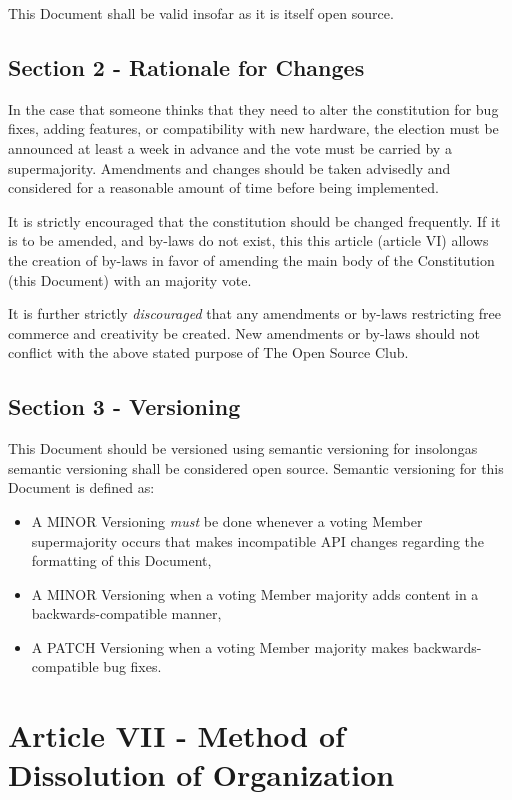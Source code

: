 \documentclass{article}
\begin{document}
  This Document shall be valid insofar as it is itself open source.

  \subsection{Section 2 - Rationale for Changes}

	In the case that someone thinks that they need to alter the constitution for bug fixes, adding features, or compatibility with new hardware, the election must be announced at least a week in advance and the vote must be carried by a supermajority. Amendments and changes should be taken advisedly and considered for a reasonable amount of time before being implemented.

	It is strictly encouraged that the constitution should be changed frequently. If it is to be amended, and by-laws do not exist, this this article (article VI) allows the creation of by-laws in favor of amending the main body of the Constitution (this Document) with an majority vote.

	It is further strictly \textit{discouraged} that any amendments or by-laws restricting free commerce and creativity be created. New amendments or by-laws should not conflict with the above stated purpose of The Open Source Club.

  \subsection{Section 3 - Versioning}

  This Document should be versioned using semantic versioning for insolongas semantic versioning shall be considered open source. Semantic versioning for this Document is defined as:

  \begin{itemize}
    \item A MINOR Versioning \textit{must} be done whenever a voting Member supermajority occurs that makes incompatible API changes regarding the formatting of this Document,
    \item A MINOR Versioning when a voting Member majority adds content in a backwards-compatible manner,
    \item A PATCH Versioning when a voting Member majority makes backwards-compatible bug fixes.
  \end{itemize}

	\section{Article VII - Method of Dissolution of Organization}
\end{document}
